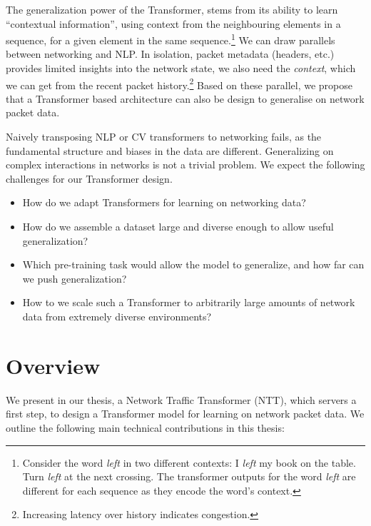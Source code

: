 The generalization power of the Transformer, stems from its ability to learn ``contextual information'', using context from the neighbouring elements in a sequence, for a given element in the same sequence\cite{devlinBERTPretrainingDeep2019}.\footnote{Consider the word \emph{left} in two different contexts: I \emph{left} my book on the table. Turn \emph{left} at the next crossing. The transformer outputs for the word \emph{left} are different for each sequence as they encode the word's context.}
We can draw parallels between networking and NLP. In isolation, packet metadata (headers, etc.) provides limited insights into the network state, we also need the \emph{context}, \ie which we can get from the recent packet history.\footnote{Increasing latency over history indicates congestion.} Based on these parallel, we propose that a Transformer based architecture can also be design to generalise on network packet data. 

Naively transposing NLP or CV transformers to networking fails, as the fundamental structure and biases\cite{biases} in the data are different. Generalizing on complex interactions in networks is not a trivial problem. We expect the following challenges for our Transformer design.

\begin{itemize}
    \item
          How do we adapt Transformers for learning on networking data?
    \item
          How do we assemble a dataset large and diverse enough to allow useful generalization?
    \item
          Which pre-training task would allow the model to generalize, and how far can we push generalization?
    \item 
    	 How to we scale such a Transformer to arbitrarily large amounts of network data from extremely diverse environments?
\end{itemize}

\section{Overview}
\label{sec:overview}

We present in our thesis, a Network Traffic Transformer (NTT), which servers a first step, to design a Transformer model for learning on network packet data. We outline the following main technical contributions in this thesis:

